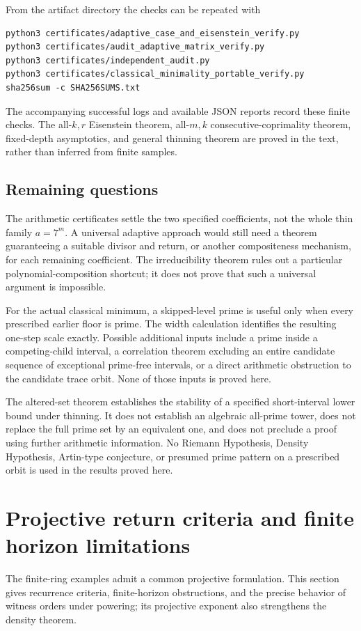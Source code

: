 \documentclass[11pt,a4paper]{article}
\theoremstyle{definition}\newtheorem{definition}[theorem]{Definition}
\theoremstyle{remark}\newtheorem{remark}[theorem]{Remark}
\begin{document}
From the artifact directory the checks can be repeated with
\begin{lstlisting}
python3 certificates/adaptive_case_and_eisenstein_verify.py
python3 certificates/audit_adaptive_matrix_verify.py
python3 certificates/independent_audit.py
python3 certificates/classical_minimality_portable_verify.py
sha256sum -c SHA256SUMS.txt
\end{lstlisting}
The accompanying successful logs and available JSON reports record
these finite checks. The all-$k,r$ Eisenstein theorem,
all-$m,k$ consecutive-coprimality theorem, fixed-depth asymptotics,
and general thinning theorem are proved in the text, rather than
inferred from finite samples.


\subsection{Remaining questions}

The arithmetic certificates settle the two specified coefficients,
not the whole thin family $a=7^m$. A universal adaptive approach
would still need a theorem guaranteeing a suitable divisor and
return, or another compositeness mechanism, for each remaining
coefficient. The irreducibility theorem rules out a particular
polynomial-composition shortcut; it does not prove that such a
universal argument is impossible.

For the actual classical minimum, a skipped-level prime is useful
only when every prescribed earlier floor is prime. The width
calculation identifies the resulting one-step scale exactly.
Possible additional inputs include a prime inside a competing-child
interval, a correlation theorem excluding an entire candidate
sequence of exceptional prime-free intervals, or a direct arithmetic
obstruction to the candidate trace orbit. None of those inputs is
proved here.

The altered-set theorem establishes the stability of a specified
short-interval lower bound under thinning. It does not establish
an algebraic all-prime tower, does not replace the full prime set
by an equivalent one, and does not preclude a proof using further
arithmetic information. No Riemann Hypothesis, Density Hypothesis,
Artin-type conjecture, or presumed prime pattern on a prescribed
orbit is used in the results proved here.



\endgroup

\section{Projective return criteria and finite horizon limitations}\label{src:R15}
The finite-ring examples admit a common projective formulation. This section gives recurrence criteria, finite-horizon obstructions, and the precise behavior of witness orders under powering; its projective exponent also strengthens the density theorem.
\medskip
\begingroup
\end{document}
